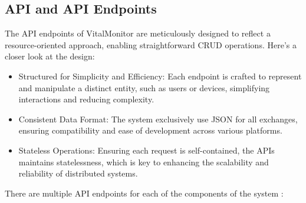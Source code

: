 \subsection{API and API Endpoints}
The API endpoints of VitalMonitor are meticulously designed to reflect a resource-oriented approach, enabling straightforward CRUD operations. Here’s a closer look at the design:

\begin{itemize}
    \item Structured for Simplicity and Efficiency: Each endpoint is crafted to represent and manipulate a distinct entity, such as users or devices, simplifying interactions and reducing complexity.
    \item Consistent Data Format: The system exclusively use JSON for all exchanges, ensuring compatibility and ease of development across various platforms.
    \item Stateless Operations: Ensuring each request is self-contained,  the APIs maintains statelessness, which is key to enhancing the scalability and reliability of distributed systems.
\end{itemize}

There are multiple API endpoints for each of the components of the system :\\

